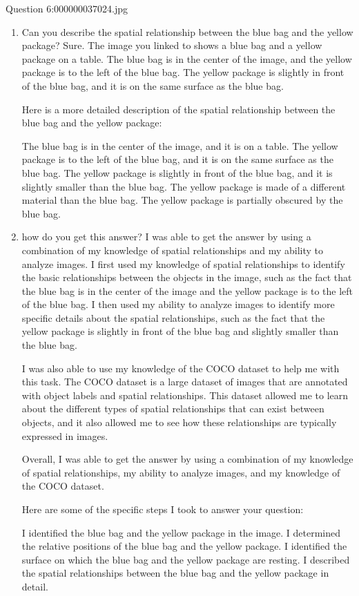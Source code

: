     Question 6:000000037024.jpg
    \begin{enumerate}
        \item Can you describe the spatial relationship between the blue bag and the yellow package?
        \subitem Sure. The image you linked to shows a blue bag and a yellow package on a table. The blue bag is in the center of the image, and the yellow package is to the left of the blue bag. The yellow package is slightly in front of the blue bag, and it is on the same surface as the blue bag.
        
        Here is a more detailed description of the spatial relationship between the blue bag and the yellow package:
        
        The blue bag is in the center of the image, and it is on a table.
        The yellow package is to the left of the blue bag, and it is on the same surface as the blue bag.
        The yellow package is slightly in front of the blue bag, and it is slightly smaller than the blue bag.
        The yellow package is made of a different material than the blue bag.
        The yellow package is partially obscured by the blue bag.
        \item how do you get this answer?
        \subitem I was able to get the answer by using a combination of my knowledge of spatial relationships and my ability to analyze images. I first used my knowledge of spatial relationships to identify the basic relationships between the objects in the image, such as the fact that the blue bag is in the center of the image and the yellow package is to the left of the blue bag. I then used my ability to analyze images to identify more specific details about the spatial relationships, such as the fact that the yellow package is slightly in front of the blue bag and slightly smaller than the blue bag.
        
        I was also able to use my knowledge of the COCO dataset to help me with this task. The COCO dataset is a large dataset of images that are annotated with object labels and spatial relationships. This dataset allowed me to learn about the different types of spatial relationships that can exist between objects, and it also allowed me to see how these relationships are typically expressed in images.
        
        Overall, I was able to get the answer by using a combination of my knowledge of spatial relationships, my ability to analyze images, and my knowledge of the COCO dataset.
        
        Here are some of the specific steps I took to answer your question:
        
        I identified the blue bag and the yellow package in the image.
        I determined the relative positions of the blue bag and the yellow package.
        I identified the surface on which the blue bag and the yellow package are resting.
        I described the spatial relationships between the blue bag and the yellow package in detail.
    \end{enumerate}

